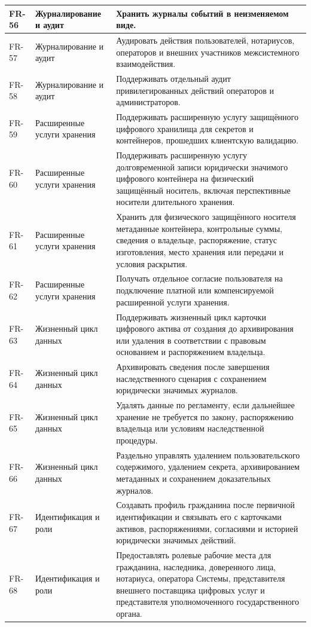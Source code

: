 \begin{longtable}{|P{1.45cm}|P{3.35cm}|P{10.7cm}|}
FR-56 & Журналирование и аудит & Хранить журналы событий в неизменяемом виде.\\ \hline
FR-57 & Журналирование и аудит & Аудировать действия пользователей, нотариусов, операторов и внешних участников межсистемного взаимодействия.\\ \hline
FR-58 & Журналирование и аудит & Поддерживать отдельный аудит привилегированных действий операторов и администраторов.\\ \hline
FR-59 & Расширенные услуги хранения & Поддерживать расширенную услугу защищённого цифрового хранилища для секретов и контейнеров, прошедших клиентскую валидацию.\\ \hline
FR-60 & Расширенные услуги хранения & Поддерживать расширенную услугу долговременной записи юридически значимого цифрового контейнера на физический защищённый носитель, включая перспективные носители длительного хранения.\\ \hline
FR-61 & Расширенные услуги хранения & Хранить для физического защищённого носителя метаданные контейнера, контрольные суммы, сведения о владельце, распоряжение, статус изготовления, место хранения или передачи и условия раскрытия.\\ \hline
FR-62 & Расширенные услуги хранения & Получать отдельное согласие пользователя на подключение платной или компенсируемой расширенной услуги хранения.\\ \hline
FR-63 & Жизненный цикл данных & Поддерживать жизненный цикл карточки цифрового актива от создания до архивирования или удаления в соответствии с правовым основанием и распоряжением владельца.\\ \hline
FR-64 & Жизненный цикл данных & Архивировать сведения после завершения наследственного сценария с сохранением юридически значимых журналов.\\ \hline
FR-65 & Жизненный цикл данных & Удалять данные по регламенту, если дальнейшее хранение не требуется по закону, распоряжению владельца или условиям наследственной процедуры.\\ \hline
FR-66 & Жизненный цикл данных & Раздельно управлять удалением пользовательского содержимого, удалением секрета, архивированием метаданных и сохранением доказательных журналов.\\ \hline
FR-67 & Идентификация и роли & Создавать профиль гражданина после первичной идентификации и связывать его с карточками активов, распоряжениями, согласиями и историей юридически значимых действий.\\ \hline
FR-68 & Идентификация и роли & Предоставлять ролевые рабочие места для гражданина, наследника, доверенного лица, нотариуса, оператора Системы, представителя внешнего поставщика цифровых услуг и представителя уполномоченного государственного органа.\\ \hline

\end{longtable}
